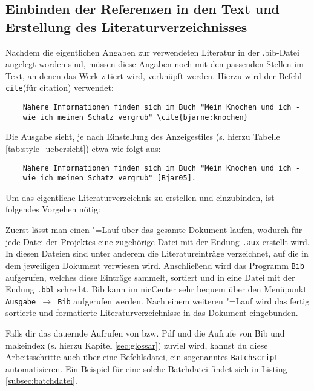 \subsection{Einbinden der Referenzen in den Text und Erstellung des
Literaturverzeichnisses}
Nachdem die eigentlichen Angaben zur verwendeten Literatur in der .bib-Datei
angelegt worden sind, müssen diese Angaben noch mit den passenden Stellen im
Text, an denen das Werk zitiert wird, verknüpft werden.
Hierzu wird der Befehl \texttt{cite{}}(für citation) verwendet:
\begin{verbatim}
	Nähere Informationen finden sich im Buch "Mein Knochen und ich -
	wie ich meinen Schatz vergrub" \cite{bjarne:knochen}
\end{verbatim}
\newpage
Die Ausgabe sieht, je nach Einstellung des Anzeigestiles (s. hierzu Tabelle
\ref{tab:style_uebersicht}) etwa wie folgt aus:
\begin{verbatim}
	Nähere Informationen finden sich im Buch "Mein Knochen und ich -
	wie ich meinen Schatz vergrub" [Bjar05].
\end{verbatim}
Um das eigentliche Literaturverzeichnis zu erstellen und einzubinden, ist folgendes Vorgehen
nötig:

Zuerst lässt man einen \DMLLaTeX"=Lauf über das gesamte Dokument laufen, wodurch
für jede Datei der Projektes eine zugehörige Datei mit der Endung \texttt{.aux}
erstellt wird. In diesen Dateien sind unter anderem die Literatureinträge
verzeichnet, auf die in dem jeweiligen Dokument verwiesen wird.
Anschließend wird das Programm \texttt{Bib\DMLTeX} aufgerufen, welches diese Einträge
sammelt, sortiert und in eine Datei mit der Endung \texttt{.bbl} schreibt.
Bib\DMLTeX{} kann im \DMLTeX nicCenter sehr bequem über den Menüpunkt \texttt{Ausgabe
$\rightarrow$ Bib\DMLTeX} aufgerufen werden. Nach einem weiteren \DMLLaTeX"=Lauf wird
das fertig sortierte und formatierte Literaturverzeichnisse in das Dokument
eingebunden.

Falls dir das dauernde Aufrufen von \DMLLaTeX{} bzw. Pdf\DMLTeX{} und die Aufrufe von
Bib\DMLTeX{} und makeindex (s. hierzu Kapitel \ref{sec:glossar}) zuviel wird, kannst du diese
Arbeitsschritte auch über eine Befehlsdatei, ein sogenanntes \texttt{Batchscript}
automatisieren. Ein Beispiel für eine solche Batchdatei findet sich in Listing
\ref{subsec:batchdatei}.

